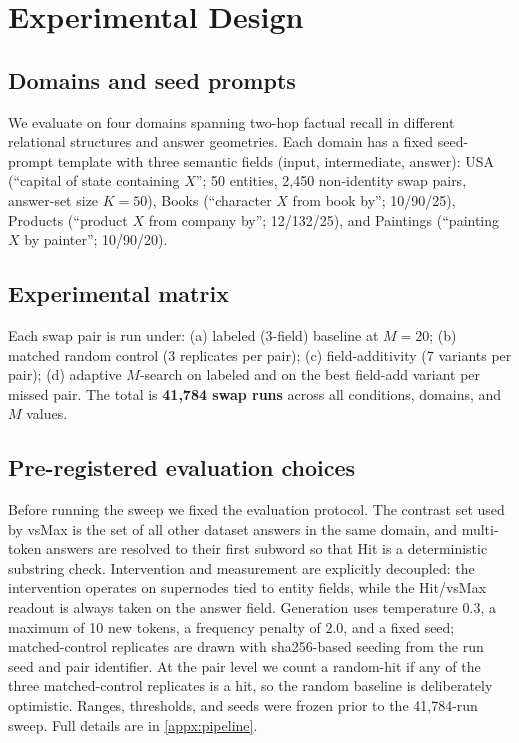 \section{Experimental Design}
\label{sec:expdesign}

\subsection{Domains and seed prompts}
\label{sec:expdesign:domains}
We evaluate on four domains spanning two-hop factual recall in different relational structures and answer geometries. Each domain has a fixed seed-prompt template with three semantic fields (input, intermediate, answer): USA (``capital of state containing $X$''; 50 entities, 2{,}450 non-identity swap pairs, answer-set size $K{=}50$), Books (``character $X$ from book by''; 10/90/25), Products (``product $X$ from company by''; 12/132/25), and Paintings (``painting $X$ by painter''; 10/90/20).

\subsection{Experimental matrix}
\label{sec:expdesign:matrix}
Each swap pair is run under: (a) labeled (3-field) baseline at $M{=}20$; (b) matched random control (3 replicates per pair); (c) field-additivity (7 variants per pair); (d) adaptive $M$-search on labeled and on the best field-add variant per missed pair. The total is \textbf{41{,}784 swap runs} across all conditions, domains, and $M$ values.

\subsection{Pre-registered evaluation choices}
\label{sec:expdesign:prereg}
Before running the sweep we fixed the evaluation protocol. The contrast set used by vsMax is the set of all other dataset answers in the same domain, and multi-token answers are resolved to their first subword so that Hit is a deterministic substring check. Intervention and measurement are explicitly decoupled: the intervention operates on supernodes tied to entity fields, while the Hit/vsMax readout is always taken on the answer field. Generation uses temperature $0.3$, a maximum of 10 new tokens, a frequency penalty of $2.0$, and a fixed seed; matched-control replicates are drawn with sha256-based seeding from the run seed and pair identifier. At the pair level we count a random-hit if any of the three matched-control replicates is a hit, so the random baseline is deliberately optimistic. Ranges, thresholds, and seeds were frozen prior to the 41{,}784-run sweep. Full details are in \cref{appx:pipeline}.

